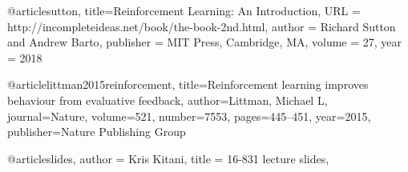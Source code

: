 @article{sutton,
  title={Reinforcement Learning: An Introduction},
  URL = {http://incompleteideas.net/book/the-book-2nd.html},
  author = {Richard Sutton and Andrew Barto},
  publisher = {MIT Press, Cambridge, MA},
  volume = {27},
  year = {2018}
}

@article{littman2015reinforcement,
  title={Reinforcement learning improves behaviour from evaluative feedback},
  author={Littman, Michael L},
  journal={Nature},
  volume={521},
  number={7553},
  pages={445--451},
  year={2015},
  publisher={Nature Publishing Group}
}



@article{slides,
author = {Kris Kitani},
title = {16-831 lecture slides},
}